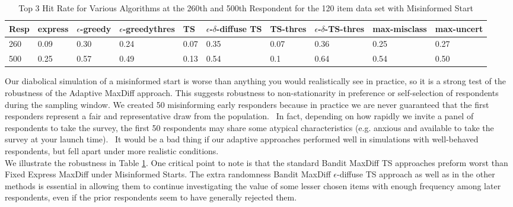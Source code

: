 \documentclass[nonblindrev]{informs3}
\newcommand{\fixedexpress}{\textbf{express}}
\newcommand{\egreedy}{$\epsilon$-\textbf{greedy}}
\newcommand{\egreedythres}{$\epsilon$-\textbf{greedythres}}
\newcommand{\mismin}{\textbf{max-misclass}}
\newcommand{\ts}{\textbf{TS} }
\newcommand{\edts}{$\epsilon$-$\delta$-\textbf{diffuse TS} }
\newcommand{\tsthres}{\textbf{TS-thres} }
\newcommand{\edtsthres}{$\epsilon$-$\delta$-\textbf{TS-thres} }
\newcommand{\uncert}{\textbf{max-uncert} }
\begin{document}
\begin{table}
\begin{tabular}{llllllllll}
\hline   Resp &  \fixedexpress&\egreedy&\egreedythres&\ts&\edts&\tsthres&\edtsthres& \mismin& \uncert   \\ \hline    260 &   0.09 &   0.30 & 0.24 & 0.07  & 0.35 & 0.07 &  0.36 & 0.25 &   0.27 \\
  500 &  0.25 &   0.57 &  0.49 &  0.13 & 0.54 &   0.1 &    0.64 & 0.54 &  0.50  \end{tabular}
\begin{center}
\caption{Top 3 Hit Rate for Various Algorithms at the 260th and 500th Respondent for the 120 item data set with Misinformed Start}
\label{table:120mis}
\end{center}
\end{table}

Our diabolical simulation of a misinformed start is worse than anything you would realistically see in practice, so it is a strong test of the robustness of the Adaptive MaxDiff approach. This suggests robustness to non-stationarity in preference or self-selection of respondents during the sampling window. We created 50 misinforming early responders because in practice we are never guaranteed that the first responders represent a fair and representative draw from the population.  In fact, depending on how rapidly we invite a panel of respondents to take the survey, the first 50 respondents may share some atypical characteristics (e.g. anxious and available to take the survey at your launch time).  It would be a bad thing if our adaptive approaches performed well in simulations with well-behaved respondents, but fell apart under more realistic conditions. \\

We illustrate the robustness in Table \ref{table:120mis}. One critical point to note is that the standard Bandit MaxDiff TS approaches preform worst than Fixed Express MaxDiff under Misinformed Starts.  The extra randomness Bandit MaxDiff $\epsilon$-diffuse TS approach as well as in the other methods  is essential in allowing them to continue investigating the value of some lesser chosen items with enough frequency among later respondents, even if the prior respondents seem to have generally rejected them.
\end{document}
